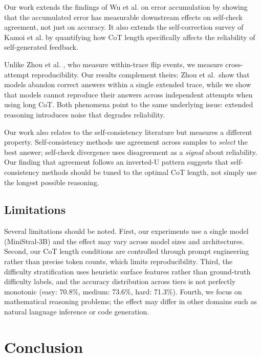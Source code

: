 \documentclass[11pt,letterpaper]{article}
\begin{document}
Our work extends the findings of Wu et al. \citep{Wu2025} on error accumulation by showing that the accumulated error has measurable downstream effects on self-check agreement, not just on accuracy. It also extends the self-correction survey of Kamoi et al. \citep{Kamoi2024} by quantifying how CoT length specifically affects the reliability of self-generated feedback.

Unlike Zhou et al. \citep{Zhou2026}, who measure within-trace flip events, we measure cross-attempt reproducibility. Our results complement theirs: Zhou et al.\ show that models abandon correct answers within a single extended trace, while we show that models cannot reproduce their answers across independent attempts when using long CoT. Both phenomena point to the same underlying issue: extended reasoning introduces noise that degrades reliability.

Our work also relates to the self-consistency literature \citep{Wang2022,Wan2024,Taubenfeld2025,Zhou2025} but measures a different property. Self-consistency methods use agreement across samples to \textit{select} the best answer; self-check divergence uses disagreement as a \textit{signal} about reliability. Our finding that agreement follows an inverted-U pattern suggests that self-consistency methods should be tuned to the optimal CoT length, not simply use the longest possible reasoning.

\subsection{Limitations}

Several limitations should be noted. First, our experiments use a single model (MiniStral-3B) and the effect may vary across model sizes and architectures. Second, our CoT length conditions are controlled through prompt engineering rather than precise token counts, which limits reproducibility. Third, the difficulty stratification uses heuristic surface features rather than ground-truth difficulty labels, and the accuracy distribution across tiers is not perfectly monotonic (easy: 70.8\%, medium: 73.6\%, hard: 71.3\%). Fourth, we focus on mathematical reasoning problems; the effect may differ in other domains such as natural language inference or code generation.

\section{Conclusion}
\end{document}
